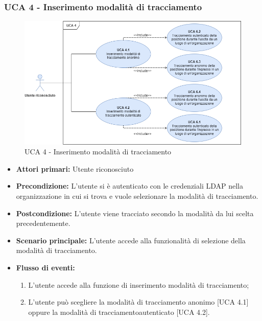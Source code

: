 \subsubsection{UCA 4 - Inserimento modalità di tracciamento}%

\begin{figure}[h]
	\centering	
	\includegraphics[scale=0.53, center]{Sezioni/UseCase/Immagini/UCA4.png}
	\caption{UCA 4 - Inserimento modalità di tracciamento}
\end{figure}

\begin{itemize}
	\item \textbf{Attori primari:} Utente riconosciuto
	\item \textbf{Precondizione:} L'utente si è autenticato con le credenziali LDAP nella organizzazione in cui si trova e vuole selezionare la modalità di tracciamento.
	\item \textbf{Postcondizione:} L'utente viene tracciato secondo la modalità da lui scelta precedentemente.
	\item \textbf{Scenario principale:} L'utente accede alla funzionalità di selezione della modalità di tracciamento.
	\item \textbf{Flusso di eventi:}
	\begin{enumerate}
		\item L'utente accede alla funzione di inserimento modalità di tracciamento;
		\item L'utente può scegliere la modalità di tracciamento anonimo\ap{G} [UCA 4.1] oppure la modalità di tracciamentoautenticato [UCA 4.2].
	\end{enumerate}
\end{itemize}

